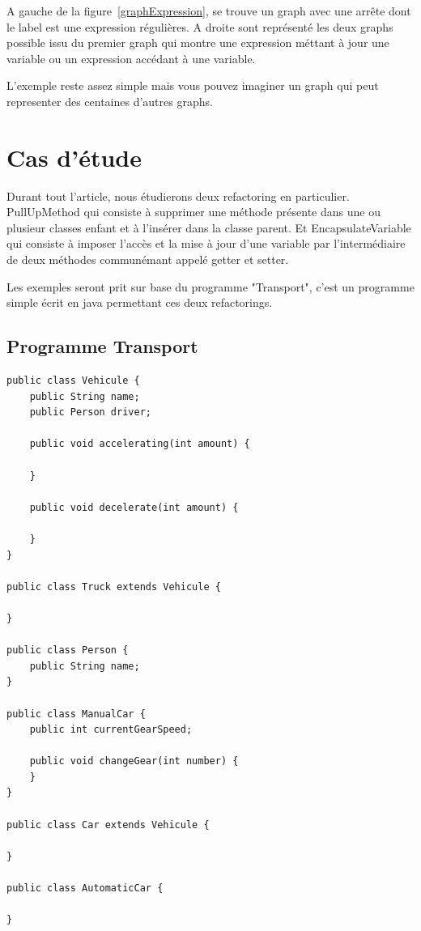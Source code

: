 \documentclass[a4paper, 12pt]{article}
\begin{document}
A gauche de la figure~\ref{graphExpression}, se trouve un graph avec une arrête dont le label est une expression régulières. A droite sont représenté les deux graphs possible issu du premier graph qui montre une expression méttant à jour une variable ou un expression accédant à une variable.

L'exemple reste assez simple mais vous pouvez imaginer un graph qui peut representer des centaines d'autres graphs.

\section{Cas d'étude}

Durant tout l'article, nous étudierons deux refactoring en particulier. PullUpMethod qui consiste à supprimer une méthode présente dans une ou plusieur classes enfant et à l'insérer dans la classe parent.
Et EncapsulateVariable qui consiste à imposer l'accès et la mise à jour d'une variable par l'intermédiaire de deux méthodes communémant appelé getter et setter.

Les exemples seront prit sur base du programme "Transport", c'est un programme simple écrit en java permettant ces deux refactorings.

\subsection{Programme Transport}

\begin{lstlisting}[frame=single]
public class Vehicule {
	public String name;
	public Person driver;

	public void accelerating(int amount) {

	}

	public void decelerate(int amount) {
	
	}
}

public class Truck extends Vehicule {

}

public class Person {
	public String name;
}

public class ManualCar {
	public int currentGearSpeed;
	
	public void changeGear(int number) {
	}
}

public class Car extends Vehicule {

}

public class AutomaticCar {

}
\end{lstlisting}
\end{document}
